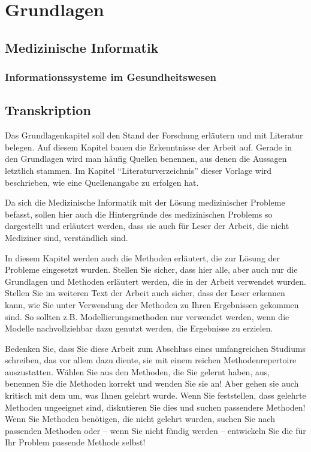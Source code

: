 \chapter{Grundlagen}\label{ch:preliminaries}

\section{Medizinische Informatik}
\subsection{Informationssysteme im Gesundheitswesen}

\section{Transkription}


Das Grundlagenkapitel soll den Stand der Forschung erläutern und mit Literatur belegen.
Auf diesem Kapitel bauen die Erkenntnisse der Arbeit auf.
Gerade in den Grundlagen wird man häufig Quellen benennen, aus denen die Aussagen letztlich stammen.
Im Kapitel \enquote{Literaturverzeichnis} dieser Vorlage wird beschrieben, wie eine Quellenangabe zu erfolgen hat.

Da sich die Medizinische Informatik mit der Lösung medizinischer Probleme befasst, sollen hier auch die Hintergründe des medizinischen Problems so dargestellt und erläutert werden, dass sie auch für Leser der Arbeit, die nicht Mediziner sind, verständlich sind.

In diesem Kapitel werden auch die Methoden erläutert, die zur Lösung der Probleme eingesetzt wurden.
Stellen Sie sicher, dass hier alle, aber auch nur die Grundlagen und Methoden erläutert werden, die in der Arbeit verwendet wurden.
Stellen Sie im weiteren Text der Arbeit auch sicher, dass der Leser erkennen kann, wie Sie unter Verwendung der Methoden zu Ihren Ergebnissen gekommen sind.
So sollten z.B. Modellierungsmethoden nur verwendet werden, wenn die Modelle nachvollziehbar dazu genutzt werden, die Ergebnisse zu erzielen.

Bedenken Sie, dass Sie diese Arbeit zum Abschluss eines umfangreichen Studiums schreiben, das vor allem dazu diente, sie mit einem reichen Methodenrepertoire auszustatten.
Wählen Sie aus den Methoden, die Sie gelernt haben, aus, benennen Sie die Methoden korrekt und wenden Sie sie an! Aber gehen sie auch kritisch mit dem um, was Ihnen gelehrt wurde.
Wenn Sie feststellen, dass gelehrte Methoden ungeeignet sind, diskutieren Sie dies und suchen passendere Methoden! Wenn Sie Methoden benötigen, die nicht gelehrt wurden, suchen Sie nach passenden Methoden oder -- wenn Sie nicht fündig werden -- entwickeln Sie die für Ihr Problem passende Methode selbst!

